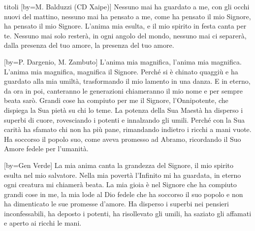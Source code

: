\begin{songs}{titoli}
[by={M. Balduzzi (CD Xaipe)}]
\beginverse
Nessuno mai ha guardato a me,
con gli occhi nuovi del mattino,
nessuno mai ha pensato a me,
come ha pensato il mio Signore,
ha pensato il mio Signore.
\endverse
\beginchorus
L'anima mia esulta,
e il mio spirito in festa canta per te.
\endchorus
\beginverse
Nessuno mai solo resterà,
in ogni angolo del mondo,
nessuno mai ci separerà,
dalla presenza del tuo amore,
la presenza del tuo amore.
\endverse
\endsong

[by={P. Dargenio, M. Zambuto}]
\beginchorus
L'anima mia magnifica, l'anima mia magnifica.
L'anima mia magnifica, magnifica il Signore. 
\endchorus
\beginverse
Perché si è chinato quaggiù e ha guardato alla mia umiltà,
trasformando il mio lamento in una danza.
E in eterno, da ora in poi, canteranno le generazioni
chiameranno il mio nome e per sempre beata sarò.
\endverse
\beginverse
Grandi cose ha compiuto per me il Signore, l'Onnipotente,
che dispiega la Sua pietà su chi lo teme.
La potenza della Sua Maestà ha disperso i superbi di cuore,
rovesciando i potenti e innalzando gli umili.
\endverse
\beginverse
Perché con la Sua carità ha sfamato chi non ha più pane,
rimandando indietro i ricchi a mani vuote.
Ha soccorso il popolo suo, come aveva promesso ad Abramo,
ricordando il Suo Amore fedele per l'umanità.
\endverse
\endsong

[by={Gen Verde}]
\beginchorus
La mia anima canta la grandezza del Signore,
il mio spirito esulta nel mio salvatore.
Nella mia povertà l'Infinito mi ha guardata,
in eterno ogni creatura mi chiamerà beata.
\endchorus
\beginverse
La mia gioia è nel Signore che ha compiuto grandi cose in me,
la mia lode al Dio fedele che ha soccorso il suo popolo
e non ha dimenticato le sue promesse d'amore.
\endverse
\beginverse
Ha disperso i superbi nei pensieri inconfessabili,
ha deposto i potenti, ha risollevato gli umili,
ha saziato gli affamati e aperto ai ricchi le mani.
\endverse
\endsong


\end{songs}
